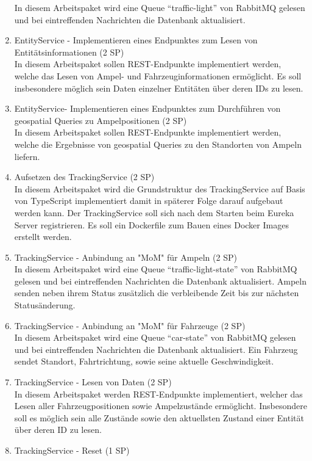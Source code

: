 \begin{enumerate}
  		In diesem Arbeitspaket wird eine Queue \enquote{traffic-light} von RabbitMQ gelesen und bei eintreffenden Nachrichten die Datenbank aktualisiert.
  \item EntityService - Implementieren eines Endpunktes zum Lesen von Entitätsinformationen (2 SP)\\
  		In diesem Arbeitspaket sollen REST-Endpunkte implementiert werden, welche das Lesen von Ampel- und Fahrzeuginformationen ermöglicht.
  		Es soll insbesondere möglich sein Daten einzelner Entitäten über deren IDs zu lesen.
  \item EntityService- Implementieren eines Endpunktes zum Durchführen von geospatial Queries zu Ampelpositionen (2 SP)\\
  		In diesem Arbeitspaket sollen REST-Endpunkte implementiert werden, welche die Ergebnisse von geospatial Queries zu den Standorten von Ampeln liefern.
  \item Aufsetzen des TrackingService (2 SP)\\
  		In diesem Arbeitspaket wird die Grundstruktur des TrackingService auf Basis von TypeScript implementiert damit in späterer Folge darauf aufgebaut werden kann.
  		Der TrackingService soll sich nach dem Starten beim Eureka Server registrieren.
  		Es soll ein Dockerfile zum Bauen eines Docker Images erstellt werden.
  \item TrackingService - Anbindung an "MoM" für Ampeln (2 SP)\\
  		In diesem Arbeitspaket wird eine Queue \enquote{traffic-light-state} von RabbitMQ gelesen und bei eintreffenden Nachrichten die Datenbank aktualisiert.
  		Ampeln senden neben ihrem Status zusätzlich die verbleibende Zeit bis zur nächsten Statusänderung.
  \item TrackingService - Anbindung an "MoM" für Fahrzeuge (2 SP)\\
  		In diesem Arbeitspaket wird eine Queue \enquote{car-state} von RabbitMQ gelesen und bei eintreffenden Nachrichten die Datenbank aktualisiert.
  		Ein Fahrzeug sendet Standort, Fahrtrichtung, sowie seine aktuelle Geschwindigkeit.
  \item TrackingService - Lesen von Daten (2 SP)\\
  		In diesem Arbeitspaket werden REST-Endpunkte implementiert, welcher das Lesen aller Fahrzeugpositionen sowie Ampelzustände ermöglicht.
  		Insbesondere soll es möglich sein alle Zustände sowie den aktuellsten Zustand einer Entität über deren ID zu lesen.
  \item TrackingService - Reset (1 SP)\\

\end{enumerate}
